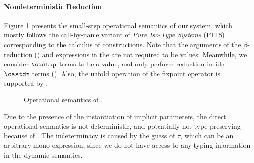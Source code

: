 \paragraph{Nondeterministic Reduction}
Figure \ref{fig:semantics} presents the small-step operational semantics of our system,
which mostly follows the call-by-name variant of \emph{Pure Iso-Type Systems} (PITS)
~\cite{yang2019pure} corresponding to the calculus of constructions.
Note that the arguments of the $\beta$-reduction () and expressions in
the  are not required to be values.
Meanwhile, we consider $\castup$ terms to be a value,
and only perform reduction inside $\castdn$ terms (). Also, the unfold
operation of the fixpoint operator is supported by .

\begin{figure}[t]
    \centering


    \caption{Operational semantics of \name.}
    \label{fig:semantics}
\end{figure}

Due to the presence of the instantiation of implicit parameters, the direct operational
semantics is not deterministic, and potentially not type-preserving because of
. The indeterminacy is caused by the guess of $\tau$,
which can be an arbitrary mono-expression, since we do not have access to any typing
information in the dynamic semantics.

